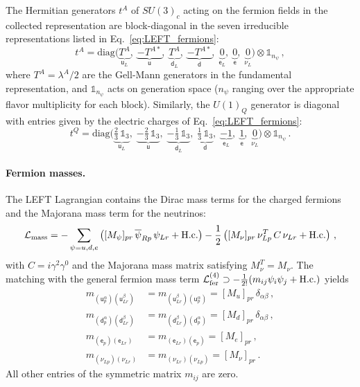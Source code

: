 The Hermitian generators $t^{A}$ of $SU(3)_c$ acting on the fermion fields in the collected representation are block-diagonal in the seven irreducible representations listed in Eq.~\eqref{eq:LEFT_fermions}:
\begin{equation}\label{eq:LEFT_SU3_gens}
    t^A = \text{diag}\Big(\underbrace{T^A}_{\mathsf{u}_L},\; \underbrace{-T^{A*}}_{\mathsf{u}},\; \underbrace{T^A}_{\mathsf{d}_L},\; \underbrace{-T^{A*}}_{\mathsf{d}},\; \underbrace{0}_{\mathsf{e}_L},\; \underbrace{0}_{\mathsf{e}},\; \underbrace{0}_{\mathsf{\nu}_L}\Big)\otimes\mathbb{1}_{n_\psi}\,,
\end{equation}
where $T^A=\lambda^A/2$ are the Gell-Mann generators in the fundamental representation, and $\mathbb{1}_{n_\psi}$ acts on generation space ($n_\psi$ ranging over the appropriate flavor multiplicity for each block). Similarly, the $U(1)_Q$ generator is diagonal with entries given by the electric charges of Eq.~\eqref{eq:LEFT_fermions}:
\begin{equation}\label{eq:LEFT_U1Q_gens}
    t^Q = \text{diag}\Big(\underbrace{ \tfrac{2}{3}\,\mathbb 1_3}_{\mathsf{u}_L},\; \underbrace{-\tfrac{2}{3}\,\mathbb 1_3}_{\mathsf{u}},\; \underbrace{-\tfrac{1}{3}\,\mathbb 1_3}_{\mathsf{d}_L},\; \underbrace{\tfrac{1}{3}\,\mathbb 1_3}_{\mathsf{d}},\; \underbrace{-1}_{\mathsf{e}_L},\; \underbrace{1}_{\mathsf{e}},\; \underbrace{0}_{\mathsf{\nu}_L}\Big)\otimes\mathbb{1}_{n_\psi}\,.
\end{equation}

\paragraph{Fermion masses.}
The LEFT Lagrangian contains the Dirac mass terms for the charged fermions and the Majorana mass term for the neutrinos:
\begin{equation}\label{eq:LEFT_mass}
    \mathcal{L}_{\rm mass} = -\sum_{\psi=u,d,e}\left([M_\psi]_{pr}\,\overline\psi_{Rp}\,\psi_{Lr} + \text{H.c.}\right) -\frac{1}{2}\left([M_\nu]_{pr}\,\nu_{Lp}^T\,C\,\nu_{Lr} + \text{H.c.}\right)\,,
\end{equation}
with $C=i\gamma^2\gamma^0$ and the Majorana mass matrix satisfying $M_\nu^T = M_\nu$. The matching with the general fermion mass term $\mathcal{L}^{(4)}_{\rm fer}\supset -\tfrac{1}{2!}(m_{ij}\psi_i\psi_j + \text{H.c.})$ yields
\begin{align}
    m_{(\mathsf{u}_p^\alpha)(\mathsf{u}_{Lr}^\beta)} &= m_{(\mathsf{u}_{Lr}^\beta)(\mathsf{u}_p^\alpha)} = [M_u]_{pr}\,\delta_{\alpha\beta}\,,\label{eq:Mu_matching}\\
    m_{(\mathsf{d}_p^\alpha)(\mathsf{d}_{Lr}^\beta)} &= m_{(\mathsf{d}_{Lr}^\beta)(\mathsf{d}_p^\alpha)} = [M_d]_{pr}\,\delta_{\alpha\beta}\,,\label{eq:Md_matching}\\
    m_{(\mathsf{e}_p)(\mathsf{e}_{Lr})} &= m_{(\mathsf{e}_{Lr})(\mathsf{e}_p)} = [M_e]_{pr}\,,\label{eq:Me_matching}\\
    m_{(\mathsf{\nu}_{Lp})(\mathsf{\nu}_{Lr})} &= m_{(\mathsf{\nu}_{Lr})(\mathsf{\nu}_{Lp})} = [M_\nu]_{pr}\,.\label{eq:Mnu_matching}
\end{align}
All other entries of the symmetric matrix $m_{ij}$ are zero.

